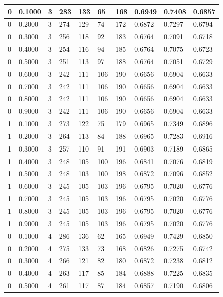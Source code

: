 \documentclass[12pt]{article}
\begin{document}
\begin{table}
{\begin{tabular}{| l | l | l | l | l | l | l | l | l | l |}
			0 & 0.1000 & 3 & 283 & 133 & 65 & 168 & 0.6949 & 0.7408 & 0.6857\\ \hline
			0 & 0.2000 & 3 & 274 & 129 & 74 & 172 & 0.6872 & 0.7297 & 0.6794\\ \hline
			0 & 0.3000 & 3 & 256 & 118 & 92 & 183 & 0.6764 & 0.7091 & 0.6718\\ \hline
			0 & 0.4000 & 3 & 254 & 116 & 94 & 185 & 0.6764 & 0.7075 & 0.6723\\ \hline
			0 & 0.5000 & 3 & 251 & 113 & 97 & 188 & 0.6764 & 0.7051 & 0.6729\\ \hline
			0 & 0.6000 & 3 & 242 & 111 & 106 & 190 & 0.6656 & 0.6904 & 0.6633\\ \hline
			0 & 0.7000 & 3 & 242 & 111 & 106 & 190 & 0.6656 & 0.6904 & 0.6633\\ \hline
			0 & 0.8000 & 3 & 242 & 111 & 106 & 190 & 0.6656 & 0.6904 & 0.6633\\ \hline
			0 & 0.9000 & 3 & 242 & 111 & 106 & 190 & 0.6656 & 0.6904 & 0.6633\\ \hline
			1 & 0.1000 & 3 & 273 & 122 & 75 & 179 & 0.6965 & 0.7349 & 0.6896\\ \hline
			1 & 0.2000 & 3 & 264 & 113 & 84 & 188 & 0.6965 & 0.7283 & 0.6916\\ \hline
			1 & 0.3000 & 3 & 257 & 110 & 91 & 191 & 0.6903 & 0.7189 & 0.6865\\ \hline
			1 & 0.4000 & 3 & 248 & 105 & 100 & 196 & 0.6841 & 0.7076 & 0.6819\\ \hline
			1 & 0.5000 & 3 & 248 & 103 & 100 & 198 & 0.6872 & 0.7096 & 0.6852\\ \hline
			1 & 0.6000 & 3 & 245 & 105 & 103 & 196 & 0.6795 & 0.7020 & 0.6776\\ \hline
			1 & 0.7000 & 3 & 245 & 105 & 103 & 196 & 0.6795 & 0.7020 & 0.6776\\ \hline
			1 & 0.8000 & 3 & 245 & 105 & 103 & 196 & 0.6795 & 0.7020 & 0.6776\\ \hline
			1 & 0.9000 & 3 & 245 & 105 & 103 & 196 & 0.6795 & 0.7020 & 0.6776\\ \hline
			0 & 0.1000 & 4 & 286 & 136 & 62 & 165 & 0.6949 & 0.7429 & 0.6850\\ \hline
			0 & 0.2000 & 4 & 275 & 133 & 73 & 168 & 0.6826 & 0.7275 & 0.6742\\ \hline
			0 & 0.3000 & 4 & 266 & 121 & 82 & 180 & 0.6872 & 0.7238 & 0.6812\\ \hline
			0 & 0.4000 & 4 & 263 & 117 & 85 & 184 & 0.6888 & 0.7225 & 0.6835\\ \hline
			0 & 0.5000 & 4 & 261 & 117 & 87 & 184 & 0.6857 & 0.7190 & 0.6806\\ \hline

\end{tabular}}
\end{table}
\end{document}
